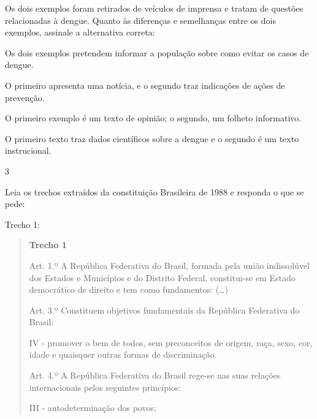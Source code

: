 
Os dois exemplos foram retirados de veículos de imprensa e tratam de
questões relacionadas à dengue. Quanto às diferenças e semelhanças entre
os dois exemplos, assinale a alternativa correta:

\begin{escolha}

\item Os dois exemplos pretendem informar a população sobre como evitar os casos de dengue.

\item O primeiro apresenta uma notícia, e o segundo traz indicações de ações de prevenção.

\item O primeiro exemplo é um texto de opinião; o segundo, um folheto informativo.

\item O primeiro texto traz dados científicos sobre a dengue e o segundo é um texto instrucional.

\end{escolha}

\num{3}

Leia os trechos extraídos da constituição Brasileira de 1988 e responda
o que se pede:

Trecho 1:

\begin{quote}

\textbf{Trecho 1}

Art. 1.º A República Federativa do Brasil, formada pela união
indissolúvel dos Estados e Municípios e do Distrito Federal,
constitui-se em Estado democrático de direito e tem como fundamentos: (\ldots{})

Art. 3.º Constituem objetivos fundamentais da República Federativa do
Brasil:

IV - promover o bem de todos, sem preconceitos de origem, raça, sexo,
cor, idade e quaisquer outras formas de discriminação.

Art. 4.º A República Federativa do Brasil rege-se nas suas relações
internacionais pelos seguintes princípios:

III - autodeterminação dos povos;

\end{quote}


